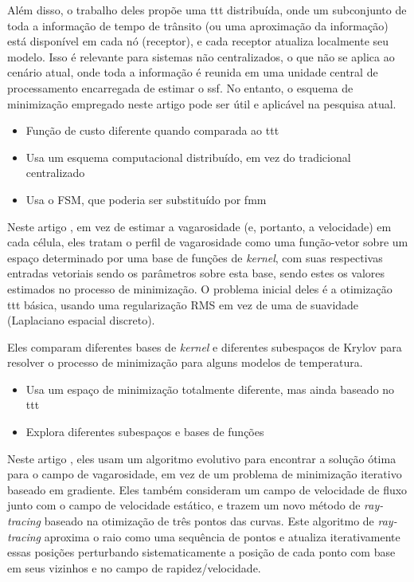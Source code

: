 Além disso, o trabalho deles propõe uma \gls{ttt} distribuída, onde um subconjunto de toda a informação de tempo de trânsito (ou uma aproximação da informação) está disponível em cada nó (receptor), e cada receptor atualiza localmente seu modelo. Isso é relevante para sistemas não centralizados, o que não se aplica ao cenário atual, onde toda a informação é reunida em uma unidade central de processamento encarregada de estimar o \gls{ssf}. No entanto, o esquema de minimização empregado neste artigo pode ser útil e aplicável na pesquisa atual.

\begin{itemize}
	\item Função de custo diferente quando comparada ao \gls{ttt}
	\item Usa um esquema computacional distribuído, em vez do tradicional centralizado
	\item Usa o FSM, que poderia ser substituído por \gls{fmm}
\end{itemize}


Neste artigo \cite{yu_krylov_2021}, em vez de estimar a vagarosidade (e, portanto, a velocidade) em cada célula, eles tratam o perfil de vagarosidade como uma função-vetor sobre um espaço determinado por uma base de funções de \textsl{kernel}, com suas respectivas entradas vetoriais sendo os parâmetros sobre esta base, sendo estes os valores estimados no processo de minimização. O problema inicial deles é a otimização \gls{ttt} básica, usando uma regularização RMS em vez de uma de suavidade (Laplaciano espacial discreto).

Eles comparam diferentes bases de \textsl{kernel} e diferentes subespaços de Krylov para resolver o processo de minimização para alguns modelos de temperatura.

\begin{itemize}
	\item Usa um espaço de minimização totalmente diferente, mas ainda baseado no \gls{ttt}
	\item Explora diferentes subespaços e bases de funções
\end{itemize}


Neste artigo \cite{zhang_nonlinear_2022}, eles usam um algoritmo evolutivo para encontrar a solução ótima para o campo de vagarosidade, em vez de um problema de minimização iterativo baseado em gradiente. Eles também consideram um campo de velocidade de fluxo junto com o campo de velocidade estático, e trazem um novo método de \textsl{ray-tracing} baseado na otimização de três pontos das curvas. Este algoritmo de \textsl{ray-tracing} aproxima o raio como uma sequência de pontos e atualiza iterativamente essas posições perturbando sistematicamente a posição de cada ponto com base em seus vizinhos e no campo de rapidez/velocidade.

